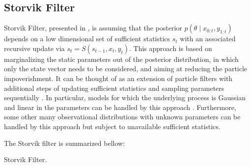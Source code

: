 \subsection{Storvik Filter}


Storvik Filter, presented in \cite{storvik2002particle}, is assuming that the posterior $p(\theta\mid x_{0:t},y_{1:t})$ depends on a low dimensional set of sufficient statistics $s_t$ with an associated recursive update via $s_t=S(s_{t-1},x_t,y_t)$. This approach is based on marginalizing the static parameters out of the posterior distribution, in which only the state vector needs to be considered, and aiming at reducing the particle impoverishment. It can be thought of as an extension of particle filters with additional steps of updating sufficient statistics and sampling parameters sequentially \cite{lopes2011particle}. In particular, models for which the underlying process is Gaussian and linear in the parameters can be handled by this approach \cite{storvik2002particle}. Furthermore, some other many observational distributions with unknown parameters can be handled by this approach but subject to unavailable sufficient statistics. 

The Storvik filter is summarized bellow:
\begin{algorithm}[h]
\SetAlgoLined 
\caption{Storvik Filter.}\label{algorithmStFilter}
\end{algorithm}


